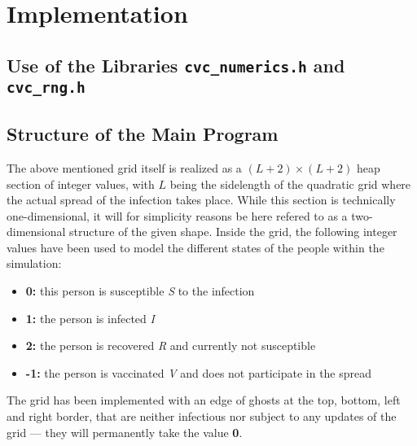 \section{Implementation}

\subsection{Use of the Libraries \texttt{cvc\_numerics.h} and \texttt{cvc\_rng.h}}

\subsection{Structure of the Main Program}

The above mentioned grid itself is realized as a $\left(L+2\right)\times \left(L+2\right)$ heap section of integer values, with $L$ being the sidelength of the quadratic grid where the actual spread of the infection takes place.
While this section is technically one-dimensional, it will for simplicity reasons be here refered to as a two-dimensional structure of the given shape. Inside the grid, the following integer values have been used 
to model the different states of the people within the simulation:
\begin{itemize}
    \item \textbf{0:} this person is susceptible \textit{S} to the infection
    \item \textbf{1:} the person is infected \textit{I}
    \item \textbf{2:} the person is recovered \textit{R} and currently not susceptible
    \item \textbf{-1:} the person is vaccinated \textit{V} and does not participate in the spread
\end{itemize}
The grid has been implemented with an edge of ghosts at the top, bottom, left and right border, that are neither infectious nor subject to any updates of the grid --- they will permanently take the value \textbf{0}.